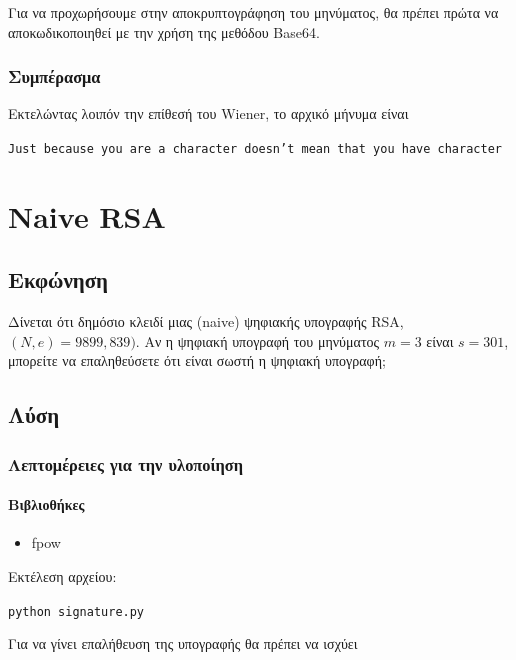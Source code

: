 \documentclass[oneside]{article}
\let\t\texttt
\begin{document}
Για να προχωρήσουμε στην αποκρυπτογράφηση του μηνύματος, θα πρέπει πρώτα να αποκωδικοποιηθεί με την χρήση της μεθόδου Base64.

\subsubsection{Συμπέρασμα}

Εκτελώντας λοιπόν την επίθεσή του Wiener, το αρχικό μήνυμα είναι

\begin{center}
    \t{Just because you are a character doesn't mean that you have character}
\end{center}

\section{Naive RSA}

\subsection{Εκφώνηση} 

Δίνεται ότι δημόσιο κλειδί μιας (naive) ψηφιακής υπογραφής RSA, $(N, e) = 9899, 839)$. Αν η ψηφιακή υπογραφή του μηνύματος $m = 3$ είναι $s = 301$, μπορείτε να επαληθεύσετε ότι είναι σωστή η ψηφιακή υπογραφή;

\subsection{Λύση}

\subsubsection{Λεπτομέρειες για την υλοποίηση}

\paragraph{Βιβλιοθήκες}

\begin{itemize}
    \item fpow
\end{itemize}

Εκτέλεση αρχείου:

\begin{center}
    \t{python signature.py}
\end{center}

Για να γίνει επαλήθευση της υπογραφής θα πρέπει να ισχύει
\end{document}
